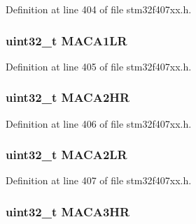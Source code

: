 Definition at line 404 of file stm32f407xx.\+h.

\subsubsection[{\texorpdfstring{M\+A\+C\+A1\+LR}{MACA1LR}}]{ uint32\+\_\+t M\+A\+C\+A1\+LR}\hypertarget{struct_e_t_h___type_def_aadfb486dd07e2fd02fb491733deffd9b}{}\label{struct_e_t_h___type_def_aadfb486dd07e2fd02fb491733deffd9b}


Definition at line 405 of file stm32f407xx.\+h.

\subsubsection[{\texorpdfstring{M\+A\+C\+A2\+HR}{MACA2HR}}]{ uint32\+\_\+t M\+A\+C\+A2\+HR}\hypertarget{struct_e_t_h___type_def_a38f1ce04678d5141e115cfd6f7b803d1}{}\label{struct_e_t_h___type_def_a38f1ce04678d5141e115cfd6f7b803d1}


Definition at line 406 of file stm32f407xx.\+h.

\subsubsection[{\texorpdfstring{M\+A\+C\+A2\+LR}{MACA2LR}}]{ uint32\+\_\+t M\+A\+C\+A2\+LR}\hypertarget{struct_e_t_h___type_def_a423b12ab536a1c4fdb1ce63f645822a7}{}\label{struct_e_t_h___type_def_a423b12ab536a1c4fdb1ce63f645822a7}


Definition at line 407 of file stm32f407xx.\+h.

\subsubsection[{\texorpdfstring{M\+A\+C\+A3\+HR}{MACA3HR}}]{ uint32\+\_\+t M\+A\+C\+A3\+HR}\hypertarget{struct_e_t_h___type_def_ad02ff09f7ce33f093ad04b84fee2bdec}{}\label{struct_e_t_h___type_def_ad02ff09f7ce33f093ad04b84fee2bdec}


